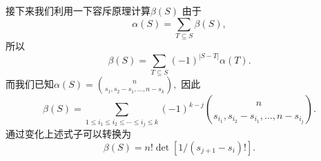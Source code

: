  接下来我们利用一下容斥原理计算$\beta(S)$
由于
$$\alpha(S)=\sum_{T\subseteq S}\beta(S),$$ 所以
$$\beta(S)=\sum_{T\subseteq S}(-1)^{|S-T|}\alpha(T).$$
而我们已知$\alpha(S)={n\choose s_1,s_2-s_1,\ldots,n-s_k},$ 因此
$$\beta(S)=\sum_{1\leq i_1\leq i_2\leq\cdots \leq i_j\leq k}(-1)^{k-j}{n\choose s_{i_1},s_{i_2}-s_{i_1},\ldots,n-s_{i_j}}.$$
通过变化上述式子可以转换为
$$\beta(S)=n!\det[1/(s_{j+1}-s_i)!].$$




